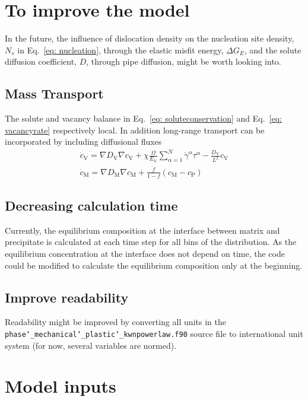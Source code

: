 \documentclass[11pt]{scrartcl}
\newcommand{\eref}[1]{Eq.~\eqref{#1}}
\begin{document}
%



\section{To improve the model}
In the future, the influence of dislocation density on the nucleation site density, $N_s$ in \eref{eq: nucleation}, through the elastic misfit energy, $\Delta G_E$, and the solute diffusion coefficient, $D$, through pipe diffusion, might be worth looking into.

\subsection{Mass Transport}

The solute and vacancy balance in \eref{eq: soluteconservation} and \eref{eq: vacancyrate} respectively local.
In addition long-range transport can be incorporated by including diffusional fluxes
%
\begin{align}
\label{eq: diffusion}
\dot{c}_\text{V} = \nabla D_\text{V} \nabla c_\text{V} + \chi \frac{\Omega}{E_\text{V}} \sum_{\alpha = 1}^{N} \dot{\gamma}^{\alpha} \tau^{\alpha} - \frac{D_\text{V}}{L^2} c_\text{V} \\
\dot{c}_\text{M} = \nabla D_\text{M} \nabla c_\text{M} + \frac{\dot{f}}{1-f}\left(c_\text{M} - c_\text{P}\right)
\end{align} 

\subsection{Decreasing calculation time}
Currently, the equilibrium composition at the interface between matrix and precipitate is calculated at each time step for all bins of the distribution. As the equilibrium concentration at the interface does not depend on time, the code could be modified to calculate the equilibrium composition only at the beginning.
\subsection{Improve readability}
Readability might be improved by converting all units in the \texttt{phase\char`_mechanical\char`_plastic\char`_kwnpowerlaw.f90} source file to international unit system (for now, several variables are normed).
\section{Model inputs}
\end{document}
